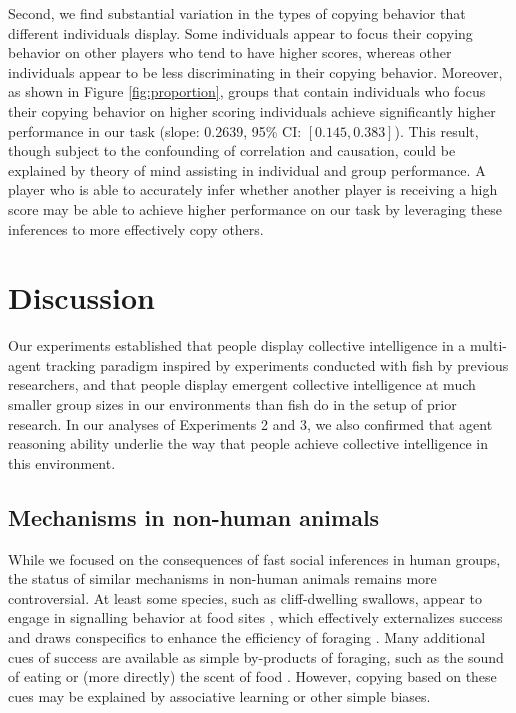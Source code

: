 \documentclass[12pt,letterpaper]{article}
\begin{document}
Second, we find substantial variation in the types of copying behavior
that different individuals display.  Some individuals appear to focus
their copying behavior on other players who tend to have higher
scores, whereas other individuals appear to be less discriminating in
their copying behavior.  Moreover, as shown in Figure
\ref{fig:proportion}, groups that contain individuals who focus their
copying behavior on higher scoring individuals achieve significantly
higher performance in our task (slope: 0.2639, 95\% CI: $[0.145,
  0.383]$).  This result, though subject to the confounding of
correlation and causation, could be explained by theory of mind
assisting in individual and group performance.  A player who is able
to accurately infer whether another player is receiving a high score
may be able to achieve higher performance on our task by leveraging
these inferences to more effectively copy others.


\section{Discussion}

Our experiments established that people display collective intelligence in a multi-agent tracking paradigm inspired by experiments conducted with fish by previous researchers, and that people display emergent collective intelligence at much smaller group sizes in our environments than fish do in the setup of prior research.  In our analyses of Experiments 2 and 3, we also confirmed that agent reasoning ability underlie the way that people achieve collective intelligence in this environment.

\subsection{Mechanisms in non-human animals}

While we focused on the consequences of fast social inferences in human groups, the status of similar mechanisms in non-human animals remains more controversial.
At least some species, such as cliff-dwelling swallows, appear to engage in signalling behavior at food sites \cite{brown1988social,brown1991food}, which effectively externalizes success and draws conspecifics to enhance the efficiency of foraging \cite{torney2011signalling}.
Many additional cues of success are available as simple by-products of foraging, such as the sound of eating or (more directly) the scent of food \cite{galef2001social}.
However, copying based on these cues may be explained by associative learning or other simple biases.
\end{document}
